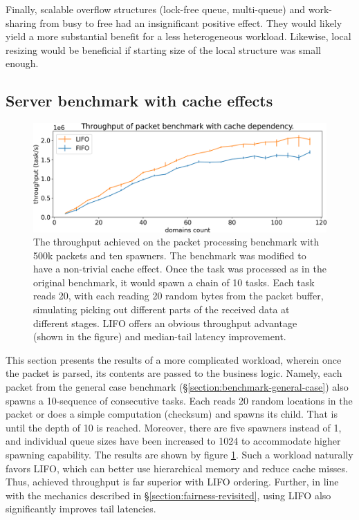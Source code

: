 \documentclass[12pt,a4paper,twoside]{report}
\begin{document}
Finally, scalable overflow structures (lock-free queue, multi-queue) and work-sharing from busy to free had an insignificant positive effect. They would likely yield a more substantial benefit for a less heterogeneous workload. Likewise, local resizing would be beneficial if starting size of the local structure was small enough.

\subsection{Server benchmark with cache effects}
\label{section:server-bench-with-cache-effects}

\begin{figure} 
    \centering 
    \includegraphics[width=1\textwidth]{eval/packet-basic-lifo-better.png}
    \caption{The throughput achieved on the packet processing benchmark with 500k packets and ten spawners. The benchmark was modified to have a non-trivial cache effect. Once the task was processed as in the original benchmark, it would spawn a chain of 10 tasks. Each task reads 20, with each reading 20 random bytes from the packet buffer, simulating picking out different parts of the received data at different stages. LIFO offers an obvious throughput advantage (shown in the figure) and median-tail latency improvement.}
   \label{fig:packet-lifo-better}
\end{figure}

This section presents the results of a more complicated workload, wherein once the packet is parsed, its contents are passed to the business logic. Namely, each packet from the general case benchmark (\S\ref{section:benchmark-general-case}) also spawns a 10-sequence of consecutive tasks. Each reads 20 random locations in the packet or does a simple computation (checksum) and spawns its child. That is until the depth of 10 is reached. Moreover, there are five spawners instead of 1, and individual queue sizes have been increased to 1024 to accommodate higher spawning capability. The results are shown by figure \ref{fig:packet-lifo-better}. Such a workload naturally favors LIFO, which can better use hierarchical memory and reduce cache misses. Thus, achieved throughput is far superior with LIFO ordering. Further, in line with the mechanics described in \S\ref{section:fairness-revisited}, using LIFO also significantly improves tail latencies.
\end{document}
